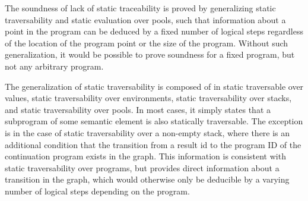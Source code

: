 \documentclass[10pt]{article}
\begin{document}
The soundness of lack of static traceability is proved by generalizing
static traversability and static evaluation over pools, such that information about a point in
the program can be deduced by a fixed number of logical steps regardless of the location of the
program point or the size of the program. Without such generalization, it would be possible to
prove soundness for a fixed program, but not any arbitrary program.

The generalization of static traversability is composed of in static traversable over values,
static traversability over environments, static traversability over stacks, and static
traversability over pools.
In most cases, it simply states that a subprogram of some semantic element is also statically
traversable. The exception is in the case of
static traversability over a non-empty stack, where
there is an additional condition that the transition
from a result id to the program ID
of the continuation program exists in the graph.
This information is consistent with static
traversability over programs, but provides direct information about a transition in the
graph, which would otherwise only be deducible by a varying number of logical steps
depending on the program.
\end{document}
